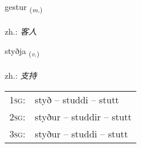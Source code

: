 \documentclass[frontgrid, backgrid]{flacards}\usepackage[]{graphicx}\usepackage[]{xcolor}
\begin{document}
\renewcommand{\flhead}{\vskip5pt \fboxsep=0pt {\small\bfseries\footnotesize Nafnorð | 名词}}
\renewcommand{\fcfoot}{\vskip5pt \fboxsep=0pt \hspace{2pt}{\small\bfseries\footnotesize 1K}}

\renewcommand{\blhead}{\vskip5pt {\small\bfseries\footnotesize Nafnorð | 名词 }}
\renewcommand{\bcfoot}{\vskip5pt \hspace{2pt}{\small\bfseries\footnotesize 1K}}


{gestur \small{\textsubscript{(\textit{m.})}} \\[1ex] %
\textphonetic{[cɛstʏr]} \\
zh.: \emph{客人} \\  [2ex]
\renewcommand*{\arraystretch}{0.8}
}

\renewcommand{\flhead}{\vskip5pt \fboxsep=0pt {\small\bfseries\footnotesize Sagnorð | 动词}}
\renewcommand{\fcfoot}{\vskip5pt \fboxsep=0pt \hspace{2pt}{\small\bfseries\footnotesize 1K}}

\renewcommand{\blhead}{\vskip5pt {\small\bfseries\footnotesize Sagnorð | 动词 }}
\renewcommand{\bcfoot}{\vskip5pt \hspace{2pt}{\small\bfseries\footnotesize 1K}}


{styðja \small{\textsubscript{(\textit{v.})}} \\[1ex] %
\textphonetic{[stɪðja]} \\
zh.: \emph{支持} \\  [2ex]
\renewcommand*{\arraystretch}{0.8}
\begin{tabular}{p{1cm}l}
\textsc{1sg}: & styð -- studdi -- stutt \\ 
\textsc{2sg}: & styður -- studdir -- stutt \\ 
\textsc{3sg}: & styður -- studdi -- stutt \\ 
\end{tabular}
}
\end{document}
